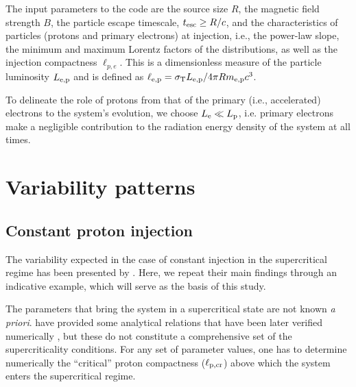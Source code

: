 \documentclass[fleqn,usenatbib]{mnras}
\newcommand{\sth}{\sigma_{\rm T}}
\newcommand{\tesc}{t_{\rm esc}}
\newcommand{\lpcr}{\ell_{\rm p,cr}}
\begin{document}
{The input parameters to the code are the source size $R$, the magnetic field strength $B$, the particle escape timescale, $\tesc \ge R/c$, and the characteristics of particles (protons and primary electrons) at injection, i.e., the power-law slope, the minimum and maximum Lorentz factors  of the distributions, as well as the injection compactness $\ell_{p,e}$. This is a dimensionless measure of the particle luminosity $L_{\rm e,p}$  and is defined as $\ell_{\rm e,p} =\sth L_{\rm e,p}/4 \pi R m_{\rm e,p} c^3$.

To delineate the role of protons from that of the primary (i.e., accelerated) electrons to the  system's evolution, we choose $L_{\rm e} \ll L_{\rm p}$, i.e. primary electrons make a negligible contribution to the radiation energy density of the system at all times.  
 

\section{Variability patterns}
\label{sec:temporal}  

\subsection{Constant proton injection}\label{sec:const}
The variability expected in the case of constant injection in the supercritical regime has been presented by \cite{petromast12b}. Here,  
we repeat their main findings through an indicative example, which will serve as the 
basis of this study. 

The parameters that bring the system in a supercritical state
are not known {\sl{a priori}}. \cite{kirkmast92} have provided some analytical
relations that have been later verified numerically \citep{mastetal05}, but these do not constitute a comprehensive set of the supercriticality conditions. For any set of parameter values,  one has to determine numerically the ``critical'' proton compactness ($\lpcr$) above which the system enters the supercritical regime. 

}
\end{document}
